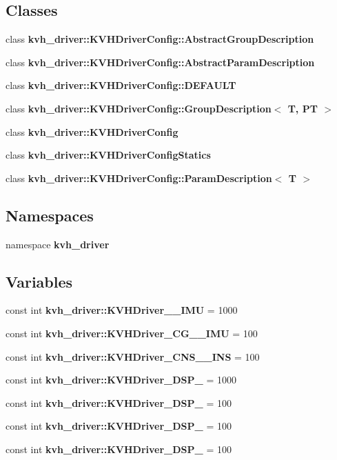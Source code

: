 \subsection*{\-Classes}
\begin{DoxyCompactItemize}
\item 
class {\bf kvh\-\_\-driver\-::\-K\-V\-H\-Driver\-Config\-::\-Abstract\-Group\-Description}
\item 
class {\bf kvh\-\_\-driver\-::\-K\-V\-H\-Driver\-Config\-::\-Abstract\-Param\-Description}
\item 
class {\bf kvh\-\_\-driver\-::\-K\-V\-H\-Driver\-Config\-::\-D\-E\-F\-A\-U\-L\-T}
\item 
class {\bf kvh\-\_\-driver\-::\-K\-V\-H\-Driver\-Config\-::\-Group\-Description$<$ T, P\-T $>$}
\item 
class {\bf kvh\-\_\-driver\-::\-K\-V\-H\-Driver\-Config}
\item 
class {\bf kvh\-\_\-driver\-::\-K\-V\-H\-Driver\-Config\-Statics}
\item 
class {\bf kvh\-\_\-driver\-::\-K\-V\-H\-Driver\-Config\-::\-Param\-Description$<$ T $>$}
\end{DoxyCompactItemize}
\subsection*{\-Namespaces}
\begin{DoxyCompactItemize}
\item 
namespace {\bf kvh\-\_\-driver}
\end{DoxyCompactItemize}
\subsection*{\-Variables}
\begin{DoxyCompactItemize}
\item 
const int {\bf kvh\-\_\-driver\-::\-K\-V\-H\-Driver\-\_\-\_\-\-I\-M\-U} = 1000
\item 
const int {\bf kvh\-\_\-driver\-::\-K\-V\-H\-Driver\-\_\-\-C\-G\-\_\-\_\-\-I\-M\-U} = 100
\item 
const int {\bf kvh\-\_\-driver\-::\-K\-V\-H\-Driver\-\_\-\-C\-N\-S\-\_\-\_\-\-I\-N\-S} = 100
\item 
const int {\bf kvh\-\_\-driver\-::\-K\-V\-H\-Driver\-\_\-\-D\-S\-P\-\_} = 1000
\item 
const int {\bf kvh\-\_\-driver\-::\-K\-V\-H\-Driver\-\_\-\-D\-S\-P\-\_} = 100
\item 
const int {\bf kvh\-\_\-driver\-::\-K\-V\-H\-Driver\-\_\-\-D\-S\-P\-\_} = 100
\item 
const int {\bf kvh\-\_\-driver\-::\-K\-V\-H\-Driver\-\_\-\-D\-S\-P\-\_} = 100
\end{DoxyCompactItemize}
